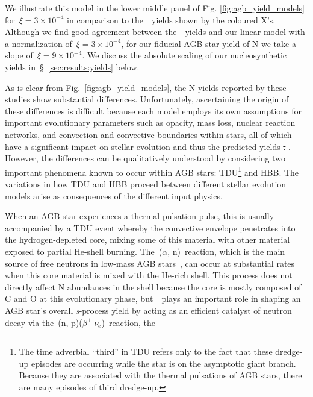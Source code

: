 \documentclass[ms.tex]{subfiles}
\begin{document}
We illustrate this model in the lower middle panel of Fig.
\ref{fig:agb_yield_models} for~$\xi = 3\times10^{-4}$ in comparison to
the~\cristallo~yields shown by the coloured X's.
Although we find good agreement between the~\cristallo~yields and our linear
model with a normalization of~$\xi = 3\times10^{-4}$, for our fiducial AGB star
yield of N we take a slope of~$\xi = 9\times10^{-4}$.
We discuss the absolute scaling of our nucleosynthetic yields
in~\S~\ref{sec:results:yields} below.
\par
As is clear from Fig.~\ref{fig:agb_yield_models}, the N yields reported by
these studies show substantial differences.
Unfortunately, ascertaining the origin of these differences is difficult
because each model employs its own assumptions for important evolutionary
parameters such as opacity, mass loss, nuclear reaction networks, and
convection and convective boundaries within stars, all of which have a
significant impact on stellar evolution and thus the predicted yields
{\color{red}
\sout{
\mbox{\citep[see discussion in, e.g.,][]{Karakas2016}}.
}
}
{\color{red}
\citep{Karakas2014b, Karakas2016, Ventura2016, Ventura2018}.
}
However, the differences can be qualitatively understood by considering two
important phenomena known to occur within AGB stars: TDU\footnote{
	The time adverbial ``third'' in TDU refers only to the fact that these
	dredge-up episodes are occurring while the star is on the asymptotic giant
	branch. Because they are associated with the thermal pulsations of AGB
	stars, there are many episodes of third dredge-up.
} and HBB.
The variations in how TDU and HBB proceed between different stellar evolution
models arise as consequences of the different input physics.
\par
When an AGB star experiences a thermal {\color{red} \sout{pulsation} pulse},
this is usually accompanied
by a TDU event whereby the convective envelope penetrates into the
hydrogen-depleted core, mixing some of this material with other material
exposed to partial He-shell burning.
The~\Cthirteen($\alpha$, n)\Osixteen~reaction, which is the main source of free
neutrons in low-mass AGB stars~\citep{Gallino1998}, can occur at substantial
rates when this core material is mixed with the He-rich shell.
This process does not directly affect N abundances in the shell because the
core is mostly composed of C and O at this evolutionary phase,
but~\Nfourteen~plays an important role in shaping an AGB star's overall
\textit{s}-process yield by acting as an efficient catalyst of neutron decay
via the~\Nfourteen(n, p)\Cfourteen($\beta^+~\nu_{e}$)\Nfourteen~reaction, the
\end{document}
